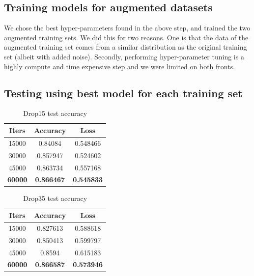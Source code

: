 \documentclass[10pt,twocolumn,letterpaper]{article}
\begin{document}
\subsection{Training models for augmented datasets}

We chose the best hyper-parameters found in the above step, and trained the two augmented training sets. We did this for two reasons. One is that the data of the augmented training set comes from a similar distribution as the original training set (albeit with added noise). Secondly, performing hyper-parameter tuning is a highly compute and time expensive step and we were limited on both fronts. 

\subsection{Testing using best model for each training set}

\begin{table}
\begin{center}
\label{drop15_test_accuracy}
\begin{tabular}{|c|c|c|}
\hline
Iters & Accuracy & Loss     \\
\hline\hline
15000 & 0.84084  & 0.548466 \\
30000 & 0.857947 & 0.524602 \\
45000 & 0.863734 & 0.557168 \\
\textbf{60000} & \textbf{0.866467} & \textbf{0.545833} \\
\hline
\end{tabular}
\end{center}
\caption{Drop15 test accuracy}
\end{table}

\begin{table}
\begin{center}
\label{drop35_test_accuracy}
\begin{tabular}{|c|c|c|}
\hline
Iters & Accuracy & Loss     \\
\hline\hline
15000 & 0.827613 & 0.588618 \\
30000 & 0.850413 & 0.599797 \\
45000 & 0.8594   & 0.615183 \\
\textbf{60000} & \textbf{0.866587} & \textbf{0.573946} \\
\hline
\end{tabular}
\end{center}
\caption{Drop35 test accuracy}
\end{table}
\end{document}
